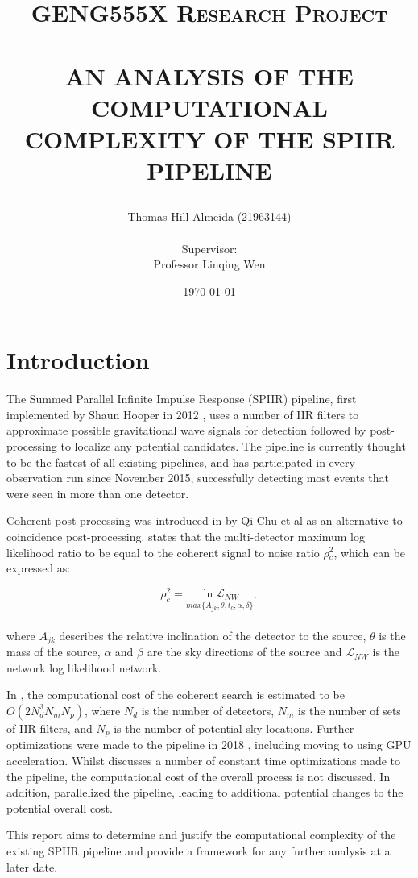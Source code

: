 \documentclass{article}
\title{\normalsize \textsc{GENG555X Research Project}
        \\ [1.5cm]
        \HRule{0.5pt} \\
        \LARGE \textbf{\uppercase{An analysis of the computational complexity of the SPIIR pipeline}}
        \HRule{2pt} \\ [0.5cm]
        \normalsize \date{\today} \vspace*{3\baselineskip}}
\author{Thomas Hill Almeida (21963144)\\
\\
Supervisor:\\
Professor Linqing Wen
}
\date{}
\begin{document}
\maketitle{}
\tableofcontents{}
\newpage{}

\section{Introduction}

The Summed Parallel Infinite Impulse Response (SPIIR) pipeline, first implemented by Shaun Hooper in 2012 \cite{SPIIRCreate}, uses a number of IIR filters to approximate possible gravitational wave signals for detection followed by post-processing to localize any potential candidates.
The pipeline is currently thought to be the fastest of all existing pipelines, and has participated in every observation run since November 2015, successfully detecting most events that were seen in more than one detector.

Coherent post-processing was introduced in \cite{ChuThesis} by Qi Chu et al as an alternative to coincidence post-processing.
\cite{ChuThesis} states that the multi-detector maximum log likelihood ratio to be equal to the coherent signal to noise ratio \(\rho{}^2_c\), which can be expressed as:

\begin{equation}
    \rho^2_c = \underset{max\{A_{jk},\theta,t_{c},\alpha,\delta\}}{\ln \mathcal{L}_{NW}},
\end{equation}
\\
where \(A_{jk}\) describes the relative inclination of the detector to the source, \(\theta\) is the mass of the source, \(\alpha\) and \(\beta\) are the sky directions of the source and \(\mathcal{L}_{NW}\) is the network log likelihood network.

In \cite{ChuThesis}, the computational cost of the coherent search is estimated to be \(O(2N^3_dN_mN_p)\), where \(N_d\) is the number of detectors, \(N_m\) is the number of sets of IIR filters, and \(N_p\) is the number of potential sky locations.
Further optimizations were made to the pipeline in 2018 \cite{SPIIRGPU2018}, including moving to using GPU acceleration.
Whilst \cite{SPIIRGPU2018} discusses a number of constant time optimizations made to the pipeline, the computational cost of the overall process is not discussed.
In addition, \cite{SPIIRGPU2018} parallelized the pipeline, leading to additional potential changes to the potential overall cost.

This report aims to determine and justify the computational complexity of the existing SPIIR pipeline and provide a framework for any further analysis at a later date.
\end{document}
